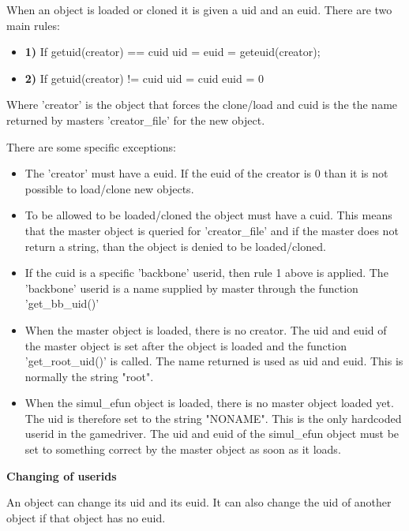 When an object is loaded or cloned it is given a uid and an euid. There are
two main rules:

\begin{itemize}
\item{\bf 1)} If getuid(creator) == cuid
        uid = euid = geteuid(creator);

\item{\bf 2)} If getuid(creator) != cuid
        uid = cuid
        euid = 0
\end{itemize}

Where 'creator' is the object that forces the clone/load and cuid is the
the name returned by masters 'creator\_file' for the new object.

There are some specific exceptions:

\begin{itemize}
\item  The 'creator' must have a euid. If the euid of the creator is 0 than it
  is not possible to load/clone new objects.

\item  To be allowed to be loaded/cloned the object must have a cuid. This means
  that the master object is queried for 'creator\_file' and if the master
  does not return a string, than the object is denied to be loaded/cloned.

\item  If the cuid is a specific 'backbone' userid, then rule 1 above is applied.
  The 'backbone' userid is a name supplied by master through the function
  'get\_bb\_uid()'

\item  When the master object is loaded, there is no creator. The uid and euid of
  the master object is set after the object is loaded and the function
  'get\_root\_uid()' is called. The name returned is used as uid and euid. This
  is normally the string "root".

\item  When the simul\_efun object is loaded, there is no master object loaded yet.
  The uid is therefore set to the string "NONAME". This is the only hardcoded
  userid in the gamedriver. The uid and euid of the simul\_efun object must
  be set to something correct by the master object as soon as it loads.
\end{itemize}

{\bf Changing of userids}

An object can change its uid and its euid. It can also change the uid of
another object if that object has no euid.

